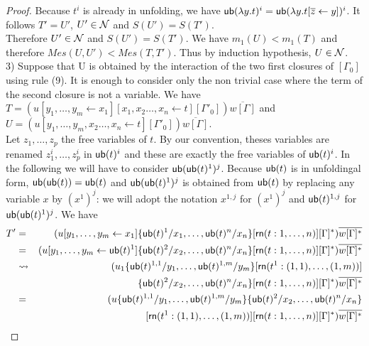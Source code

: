 \documentclass[orivec]{llncs}
\newif\ifnonotes\nonotesfalse
\newcommand{\EMPTY}[1]{\ifnonotes\else{\color{red}    \noindent #1}\fi}
\begin{document}
\begin{proof}
%
Because $t^i$ is already in unfolding, we have  ${\mathsf{ub}}(\lambda y.t)^i = {\mathsf{ub}}(\lambda y.t[\overline{z}\leftarrow  y])^i$.
It follows $T' = U'$, $U'\in\mathcal{N}$ and $S(U') = S(T')$.
\\
Therefore $U'\in\mathcal{N}$ and $S(U') = S(T')$. We  have  $m_1(U) < m_1(T)$ and therefore  $Mes(U,U') < Mes(T,T')$. Thus by induction hypothesis, $U\in\mathcal{N}$.
%
%
%
%
\medskip
\\
3)  Suppose that U is obtained by the interaction of the two first closures of $[\Gamma_0]$ using rule (9). It is enough to consider only the non trivial case where the term of the second closure is not a variable. We have \\
$T = (u[y_1,\dots,y_m  \leftarrow x_1][x_1,x_2\dots,x_n \leftarrow t][\Gamma'_0])\overline{w[\Gamma]}$   and
\\
$U = (u[y_1,\dots,y_m,x_2\dots,x_n \leftarrow t][\Gamma'_0])\overline{w[\Gamma]}$.
\\
Let $z_1,\dots,z_p$ the free variables of $t$. By our convention, theses variables are renamed $z_1^i,\dots,z_p^i$ in ${\mathsf{ub}}(t)^i$ and these are exactly the free variables of  ${\mathsf{ub}}(t)^i$. In the following we will have to consider ${\mathsf{ub}} ({\mathsf{ub}} (t)^1)^j$. Because ${\mathsf{ub}}(t)$ is in unfoldingal form, ${\mathsf{ub}}({\mathsf{ub}}(t)) = {\mathsf{ub}}(t)$ and ${\mathsf{ub}} ({\mathsf{ub}} (t)^1)^j$ is obtained from ${\mathsf{ub}}(t)$ by replacing any variable $x$ by $(x^1)^j$: we will  adopt the notation $x^{1,j}$ for $(x^1)^j$ and ${\mathsf{ub}}(t)^{1,j}$ for ${\mathsf{ub}} ({\mathsf{ub}} (t)^1)^j$.
%
We have
%
\begin{eqnarray*}
 T' & = & (u[y_1,\dots,y_m \leftarrow x_1]\{\sn(t)^1/x_1,\dots,\sn(t)^n/x_n\}[\sh (t:1,\dots,n)][\Gamma]^*)\overline{w[\Gamma]^*} \\
    & = & (u[y_1,\dots,y_m \leftarrow \sn(t)^1]\{\sn(t)^2/x_2,\dots,\sn(t)^n/x_n\}[\sh (t:1,\dots,n)][\Gamma]^*)\overline{w[\Gamma]^*} \\
    & \rightsquigarrow & (u_1\{\sn(t)^{1,1}/y_1,\dots,\sn(t)^{1,m}/y_m\}[\sh (t^1:(1,1),\dots,(1,m))] \\
    &   & \{\sn(t)^2/x_2,\dots,\sn(t)^n/x_n\}[\sh (t:1,\dots,n)][\Gamma]^*)\overline{w[\Gamma]^*} \\
    & = & (u\{\sn(t)^{1,1}/y_1,\dots,\sn(t)^{1,m}/y_m\}\{\sn(t)^2/x_2,\dots,\sn(t)^n/x_n\} \\
    &   & [\sh (t^1:(1,1),\dots,(1,m))][\sh (t:1,\dots,n)][\Gamma]^*)\overline{w[\Gamma]^*}   \\

\end{eqnarray*}
\end{proof}
\end{document}
